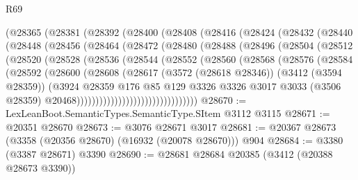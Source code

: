 \begin{lexlean}{R69}
\begin{coremodule}
    (@28365
      (@28381
        (@28392
          (@28400
            (@28408
              (@28416
                (@28424
                  (@28432
                    (@28440
                      (@28448
                        (@28456
                          (@28464
                            (@28472
                              (@28480
                                (@28488
                                  (@28496
                                    (@28504
                                      (@28512
                                        (@28520
                                          (@28528
                                            (@28536
                                              (@28544
                                                (@28552
                                                  (@28560
                                                    (@28568
                                                      (@28576
                                                        (@28584
                                                          (@28592
                                                            (@28600
                                                              (@28608
                                                                (@28617
                                                                  (@3572 (@28618 @28346))
                                                                  (@3412 (@3594 @28359))
                                                                  (@3924
                                                                    @28359
                                                                    @176
                                                                    @85
                                                                    @129
                                                                    @3326
                                                                    @3326
                                                                    @3017
                                                                    @3033
                                                                    (@3506 @28359)
                                                                    @20468))))))))))))))))))))))))))))))))
@28670 := LexLeanBoot.SemanticTypes.SemanticType.SItem @3112 @3115
@28671 := @20351 @28670
@28673 := @3076 @28671 @3017
@28681 := @20367 @28673 (@3358 (@20356 @28670) (@16932 (@20078 @28670))) @904
@28684 := @3380 (@3387 @28671) @3390
@28690 := @28681 @28684 @20385 (@3412 (@20388 @28673 @3390))

\end{coremodule}
\end{lexlean}
